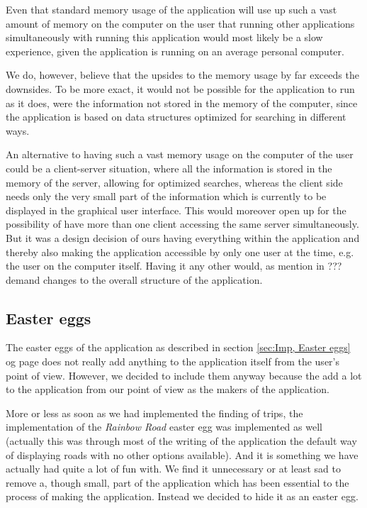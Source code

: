 \documentclass[a4paper,11pt]{article}
\begin{document}
Even that standard memory usage of the application will use up such a vast amount of memory on the computer on the user that running other applications simultaneously with running this application would most likely be a slow experience, given the application is running on an average personal computer.

We do, however, believe that the upsides to the memory usage by far exceeds the downsides. To be more exact, it would not be possible for the application to run as it does, were the information not stored in the memory of the computer, since the application is based on data structures optimized for searching in different ways.

An alternative to having such a vast memory usage on the computer of the user could be a client-server situation, where all the information is stored in the memory of the server, allowing for optimized searches, whereas the client side needs only the very small part of the information which is currently to be displayed in the graphical user interface. This would moreover open up for the possibility of have more than one client accessing the same server simultaneously. But it was a design decision of ours having everything within the application and thereby also making the application accessible by only one user at the time, e.g. the user on the computer itself. Having it any other would, as mention in ??? demand changes to the overall structure of the application.

\subsection{Easter eggs}
The easter eggs of the application as described in section \ref{sec:Imp, Easter eggs} og page \pageref{sec:Imp, Easter eggs} does not really add anything to the application itself from the user's point of view. However, we decided to include them anyway because the add a lot to the application from our point of view as the makers of the application.

More or less as soon as we had implemented the finding of trips, the implementation of the \textit{Rainbow Road} easter egg was implemented as well (actually this was through most of the writing of the application the default way of displaying roads with no other options available). And it is something we have actually had quite a lot of fun with. We find it unnecessary or at least sad to remove a, though small, part of the application which has been essential to the process of making the application. Instead we decided to hide it as an easter egg.
\end{document}
